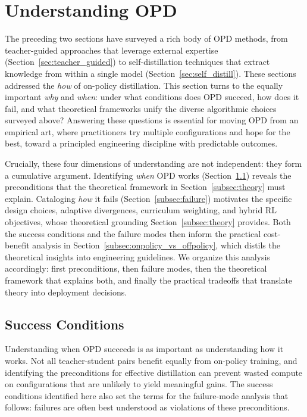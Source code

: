 \documentclass{article} %
\begin{document}
\section{Understanding OPD}
\label{sec:understanding}

The preceding two sections have surveyed a rich body of OPD methods, from teacher-guided approaches that leverage external expertise (Section~\ref{sec:teacher_guided}) to self-distillation techniques that extract knowledge from within a single model (Section~\ref{sec:self_distill}). These sections addressed the \emph{how} of on-policy distillation. This section turns to the equally important \emph{why} and \emph{when}: under what conditions does OPD succeed, how does it fail, and what theoretical frameworks unify the diverse algorithmic choices surveyed above? Answering these questions is essential for moving OPD from an empirical art, where practitioners try multiple configurations and hope for the best, toward a principled engineering discipline with predictable outcomes.

Crucially, these four dimensions of understanding are not independent: they form a cumulative argument. Identifying \emph{when} OPD works (Section~\ref{subsec:success}) reveals the preconditions that the theoretical framework in Section~\ref{subsec:theory} must explain. Cataloging \emph{how} it fails (Section~\ref{subsec:failure}) motivates the specific design choices, adaptive divergences, curriculum weighting, and hybrid RL objectives, whose theoretical grounding Section~\ref{subsec:theory} provides. Both the success conditions and the failure modes then inform the practical cost-benefit analysis in Section~\ref{subsec:onpolicy_vs_offpolicy}, which distils the theoretical insights into engineering guidelines. We organize this analysis accordingly: first preconditions, then failure modes, then the theoretical framework that explains both, and finally the practical tradeoffs that translate theory into deployment decisions.

\subsection{Success Conditions}
\label{subsec:success}

Understanding when OPD succeeds is as important as understanding how it works. Not all teacher-student pairs benefit equally from on-policy training, and identifying the preconditions for effective distillation can prevent wasted compute on configurations that are unlikely to yield meaningful gains. The success conditions identified here also set the terms for the failure-mode analysis that follows: failures are often best understood as violations of these preconditions.
\end{document}
